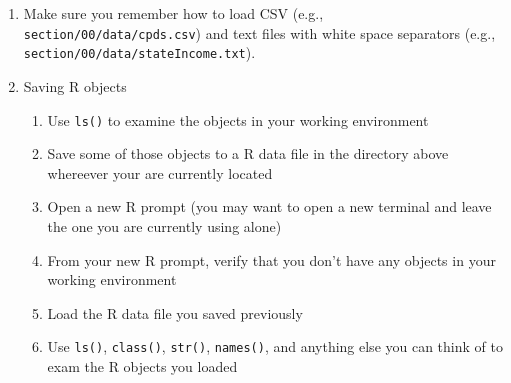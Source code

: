 \documentclass{article}
\begin{document}
\begin{enumerate}
\item Make sure you remember how to load CSV (e.g., \texttt{section/00/data/cpds.csv})
      and text files with white space separators (e.g., \texttt{section/00/data/stateIncome.txt}). 

\item Saving R objects
    \begin{enumerate}
    \item Use  \texttt{ls()} to examine the objects in your working environment
    \item Save some of those objects to a R data file in the directory above
          whereever your are currently located
    \item Open a new R prompt (you may want to open a new terminal and leave
          the one you are currently using alone)
    \item From your new R prompt, verify that you don't have any objects in your
          working environment
    \item Load the R data file you saved previously
    \item Use \texttt{ls()}, \texttt{class()}, \texttt{str()}, \texttt{names()},
          and anything else you can think of to exam the R objects you loaded

    \end{enumerate}

\end{enumerate}
\end{document}
